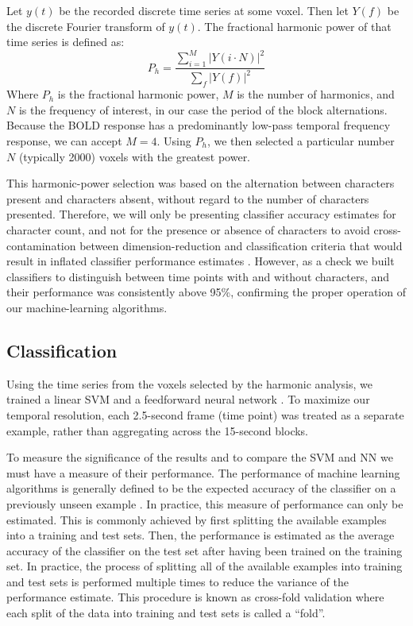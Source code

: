 \documentclass[authoryear]{elsarticle}
\begin{document}
Let $y(t)$ be the recorded discrete time series at some voxel.
Then let $Y(f)$ be the discrete Fourier transform of $y(t)$.
The fractional harmonic power of that time series is defined as:
\begin{equation}
P_h = \frac{\sum_{i = 1}^{M}{\left|Y(i \cdot N)\right|^{2}}}{\sum_{f}{\left|Y(f)\right|^{2}}}
\end{equation}
Where $P_h$ is the fractional harmonic power, $M$ is the number of harmonics, and $N$ is the frequency of interest, in our case the period of the block alternations. 
Because the BOLD response has a predominantly low-pass temporal frequency response, we can accept $M = 4$. 
Using $P_h$, we then selected a particular number $N$ (typically 2000) voxels with the greatest power. 

This harmonic-power selection was based on the alternation between characters present and characters absent, without regard to the number of characters presented. 
Therefore, we will only be presenting classifier accuracy estimates for character count, and not for the presence or absence of characters to avoid cross-contamination between dimension-reduction and  classification criteria that would result in inflated classifier performance estimates \citep{Pereira2009}.
However, as a check we built classifiers to distinguish between time points with and without characters, and their performance was consistently above 95\%, confirming the proper operation of our machine-learning algorithms.

\subsection{Classification}
Using the time series from the voxels selected by the harmonic analysis, we trained a linear SVM \citep{Cortes1995} and a feedforward neural network \citep{Hornik1989,Hagan1994}.
To maximize our temporal resolution, each 2.5-second frame (time point) was treated as a separate example, rather than aggregating across the 15-second blocks.

To measure the significance of the results and to compare the SVM and NN we must have a measure of their performance.
The performance of machine learning algorithms is generally defined to be the expected accuracy of the classifier on a previously unseen example \citep{Bishop2006}.
In practice, this measure of performance can only be estimated.
This is commonly achieved by first splitting the available examples into a training and test sets.
Then, the performance is estimated as the average accuracy of the classifier on the test set after having been trained on the training set.
In practice, the process of splitting all of the available examples into training and test sets is performed multiple times to reduce the variance of the performance estimate.
This procedure is known as cross-fold validation \citep{Kohavi1995} where each split of the data into training and test sets is called a ``fold''.
\end{document}
